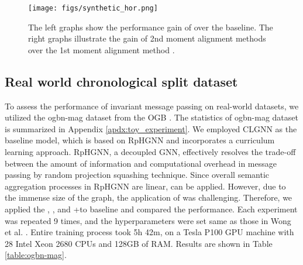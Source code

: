 \begin{figure}[!hbt]
    \vspace{-5pt}
	\centering
	\texttt{[image: figs/synthetic\_hor.png]}
	\caption{ The left graphs show the performance gain of \IMPaCT over the baseline. The right graphs illustrate the gain of 2nd moment alignment methods over the 1st moment alignment method \PMP.}
	 \label{fig:synthetic}
  \vspace{-10pt}
\end{figure}


\vspace{3pt}
\subsection{Real world chronological split dataset}

To assess the performance of invariant message passing on real-world datasets, we utilized the ogbn-mag dataset from the OGB \cite{OGB}. The statistics of ogbn-mag dataset is summarized in Appendix \ref{apdx:toy_experiment}. We employed CLGNN \cite{CLGNN} as the baseline model, which is based on RpHGNN \cite{RpHGNN} and incorporates a curriculum learning approach. RpHGNN, a decoupled GNN, effectively resolves the trade-off between the amount of information and computational overhead in message passing by random projection squashing technique. Since overall semantic aggregation processes in RpHGNN are linear, \JJnorm can be applied. However, due to the immense size of the graph, the application of \PNY was challenging. Therefore, we applied the \MMP, \PMP, and \PMP+\JJnorm to baseline and compared the performance. Each experiment was repeated 9 times, and the hyperparameters were set same as those in Wong et al. \cite{CLGNN}. Entire training process took 5h 42m, on a Tesla P100 GPU machine with 28 Intel Xeon 2680 CPUs and 128GB of RAM. Results are shown in Table \ref{table:ogbn-mag}. 

